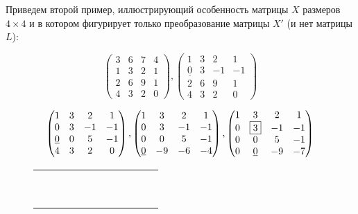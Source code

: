 \documentclass{mai_book}
\begin{document}
{\noindent Приведем второй пример, иллюстрирующий особенность матрицы $X$
размеров $4 \times 4$ и в котором фигурирует только преобразование матрицы
$X'$ (и нет матрицы $L$):




\begin{equation*}
\begin{pmatrix} 3 & 6 & 7 & 4 \\ 1 & 3 & 2 & 1 \\ 2 & 6 & 9 & 1 \\ 4 & 3 & 2 & 0 \end{pmatrix}, \begin{pmatrix} 1 & 3 & 2 & 1 \\ \underline{0} & 3 & -1 & -1 \\ 2 & 6 & 9 & 1 \\ 4 & 3 & 2 & 0 \end{pmatrix}
\end{equation*}

\begin{equation*}
\begin{pmatrix} 1 & 3 & 2 & 1 \\ 0 & 3 & -1 & -1 \\ \underline{0} & 0 & 5 & -1 \\ 4 & 3 & 2 & 0 \end{pmatrix}, \begin{pmatrix} 1 & 3 & 2 & 1 \\ 0 & 3 & -1 & -1 \\ 0 & 0 & 5 & -1 \\ \underline{0} & -9 & -6 & -4 \end{pmatrix}, \begin{pmatrix} 1 & 3 & 2 & 1 \\ 0 & \fbox{3} & -1 & -1 \\ 0 & 0 & 5 & -1 \\ 0 & \underline{0} & -9 & -7 \end{pmatrix}
\end{equation*}

\begin{figure}[htp]
\centering
\begin{tabular}{c}
\begin{lstlisting}[mathescape=true, captionpos={bo}, caption={Обращение матрицы в кольце главных идеалов}]
					

\end{lstlisting}
\end{tabular}
\end{figure}}
\end{document}

